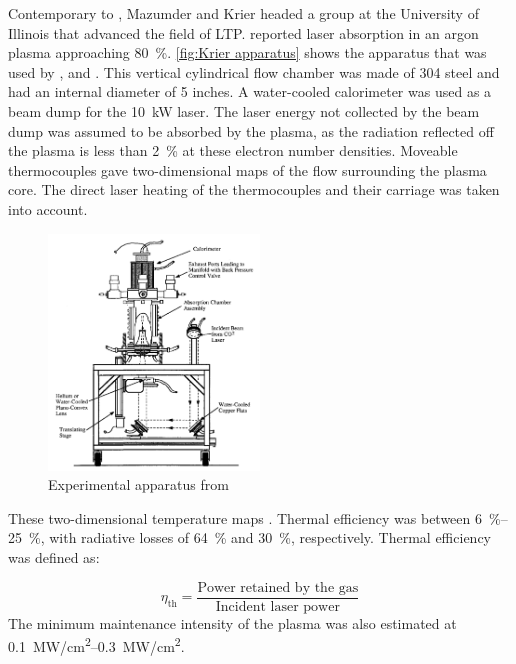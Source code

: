         Contemporary to \textcite{keeferPowerAbsorptionLasersustained1986a}, Mazumder and Krier headed a group at the University of Illinois that advanced the field of LTP. \textcite{krierContinuousWaveLaser1986a} reported laser absorption in an argon plasma approaching \qty{80}{\%}. \autoref{fig:Krier apparatus} shows the apparatus that was used by \textcite{krierContinuousWaveLaser1986a}, \textcite{zerkleLasersustainedArgonPlasmas1990} and \textcite{chenEmissionSpectroscopyCw1989a}. This vertical cylindrical flow chamber was made of 304 steel and had an internal diameter of 5 inches. A water-cooled calorimeter was used as a beam dump for the \qty{10}{kW}  laser. The laser energy not collected by the beam dump was assumed to be absorbed by the plasma, as the radiation reflected off the plasma is less than \qty{2}{\%} at these electron number densities. Moveable thermocouples gave two-dimensional maps of the flow surrounding the plasma core. The direct laser heating of the thermocouples and their carriage was taken into account.
        \begin{figure}[!ht]
            \centering
            \includegraphics[width=0.5\textwidth]{assets/2 background/Illinois (Krier) Apparatus.png}
            \caption{Experimental apparatus from \textcite{zerkleLasersustainedArgonPlasmas1990}}
            \label{fig:Krier apparatus}
        \end{figure}
        These two-dimensional temperature maps . Thermal efficiency was between \qtyrange{6}{25}{\%}, with radiative losses of \qty{64}{\%} and \qty{30}{\%}, 
        respectively. Thermal efficiency was defined as:


        \[\eta_\mathrm{th} =  \frac{\text{Power retained by the gas}}{\text{Incident laser power}}\]
        The minimum maintenance intensity of the plasma was also estimated at \qtyrange{0.1}{0.3}{MW/cm^2}.

